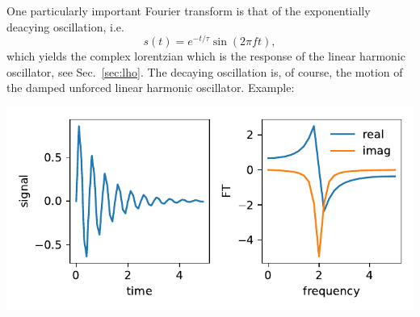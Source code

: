 \documentclass{article}
\begin{document}
One particularly important Fourier transform is that of the exponentially deacying oscillation, i.e.
\begin{equation}
    s(t) = e^{-t/\tau}\sin(2\pi f t),
\end{equation}
which yields the complex lorentzian which is the response of the linear harmonic oscillator, see Sec.~\ref{sec:lho}. The decaying oscillation is, of course, the motion of the damped unforced linear harmonic oscillator. Example:

\begin{center}
    \includegraphics{decaying_exponential.pdf}
\end{center}
\end{document}

